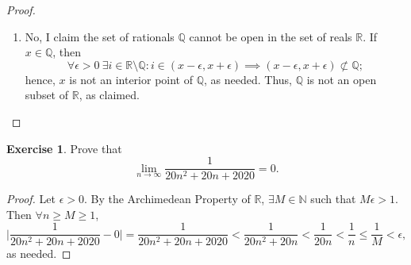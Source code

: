 \documentclass[12pt]{article}
\theoremstyle{definition}
\newtheorem{exercise}{Exercise}
\begin{document}
\begin{proof}
\begin{enumerate}[label=(\alph*)]
\begin{align*}
            &\implies \exists \epsilon_m > 0 : (x - \epsilon_m, x + \epsilon_m) \subset U_{m} \\
            &\implies \epsilon = \min\{\epsilon_1,...,\epsilon_n\} > 0 \implies (x - \epsilon, x + \epsilon) \subset \bigcap_{m = 1}^{n}U_m,
        \end{align*}
        as wanted.
        \item No, I claim the set of rationals $\mathbb{Q}$ cannot be open in the set of reals $\mathbb{R}$. If $x \in \mathbb{Q}$, then
        \[
            \forall \epsilon > 0 \ \exists i \in \mathbb{R} \setminus \mathbb{Q} : i \in (x - \epsilon, x + \epsilon) \implies (x - \epsilon, x + \epsilon) \not \subset \mathbb{Q}; 
        \]
        hence, $x$ is not an interior point of $\mathbb{Q}$, as needed. Thus, $\mathbb{Q}$ is not an open subset of $\mathbb{R}$, as claimed.
    \end{enumerate}
\end{proof}

\begin{exercise}
    Prove that
    \[
        \lim_{n \to \infty}\frac{1}{20n^2 + 20n + 2020} = 0.
    \]
\end{exercise}

\begin{proof}
    Let $\epsilon > 0$. By the Archimedean Property of $\mathbb{R}$, $\exists M \in \mathbb{N}$ such that $M\epsilon > 1$. Then $\forall n \geq M \geq 1$,
    \[
        \bigg\vert \frac{1}{20n^2 + 20n + 2020} - 0 \bigg\vert = \frac{1}{20n^2 + 20n + 2020} < \frac{1}{20n^2 + 20n} < \frac{1}{20n} < \frac{1}{n} \leq \frac{1}{M} < \epsilon,
    \]
    as needed.
\end{proof}
\end{document}
